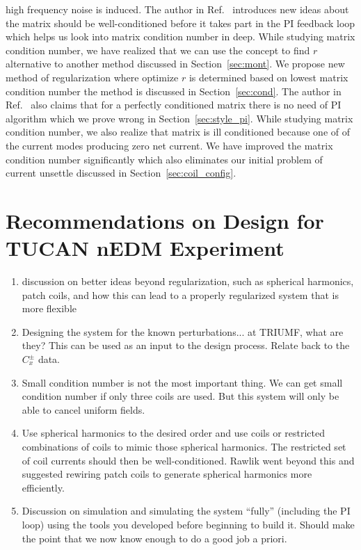 high frequency noise is induced. The author in Ref.~\cite{rawlik}
introduces new ideas about the matrix should be well-conditioned
before it takes part in the PI feedback loop which helps us look into
matrix condition number in deep. While studying matrix condition
number, we have realized that we can use the concept to find $r$
alternative to another method discussed in Section~\ref{sec:mont}. We
propose new method of regularization where optimize $r$ is determined
based on lowest matrix condition number the method is discussed in
Section~\ref{sec:cond}. The author in Ref.~\cite{rawlik} also claims
that for a perfectly conditioned matrix there is no need of PI
algorithm which we prove wrong in Section~\ref{sec:style_pi}. While
studying matrix condition number, we also realize that matrix is ill
conditioned because one of of the current modes producing zero net
current. We have improved the matrix condition number significantly
which also eliminates our initial problem of current unsettle
discussed in Section~\ref{sec:coil_config}.

\section{Recommendations on Design for TUCAN nEDM Experiment}

\begin{enumerate}
\item discussion on better ideas beyond regularization, such as spherical harmonics, patch coils, and how this can lead to a properly regularized system that is more flexible
\item Designing the system for the known perturbations... at TRIUMF, what are they?  This can be used as an input to the design process.  Relate back to the $C_x^\pm$ data.
\item Small condition number is not the most important thing.  We can get small condition number if only three coils are used.  But this system will only be able to cancel uniform fields.
\item Use spherical harmonics to the desired order and use coils or restricted combinations of coils to mimic those spherical harmonics.  The restricted set of coil currents should then be well-conditioned.  Rawlik went beyond this and suggested rewiring patch coils to generate spherical harmonics more efficiently.
\item Discussion on simulation and simulating the system ``fully'' (including the PI loop) using the tools you developed before beginning to build it.  Should make the point that we now know enough to do a good job a priori.
\end{enumerate}


